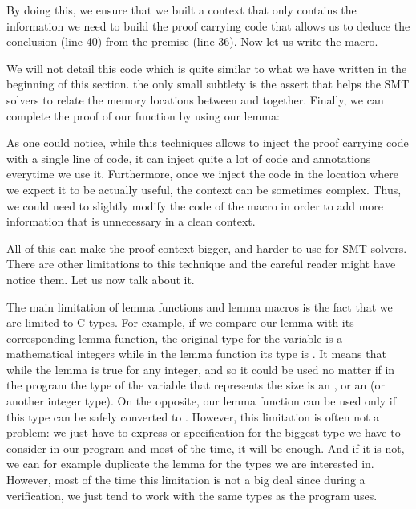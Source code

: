 By doing this, we ensure that we built a context that only contains the
information we need to build the proof carrying code that allows us to deduce
the conclusion (line 40) from the premise (line 36). Now let us write the macro.






We will not detail this code which is quite similar to what we have written in
the beginning of this section. the only small subtlety is the assert that helps
the SMT solvers to relate the memory locations between  and
 together. Finally, we can complete the proof of our function by
using our lemma:






As one could notice, while this techniques allows to inject the proof carrying
code with a single line of code, it can inject quite a lot of code and
annotations everytime we use it. Furthermore, once we inject the code in the
location where we expect it to be actually useful, the context can be sometimes
complex. Thus, we could need to slightly modify the code of the macro in order
to add more information that is unnecessary in a clean context.


All of this can make the proof context bigger, and harder to use for SMT solvers.
There are other limitations to this technique and the careful reader might have
notice them. Let us now talk about it.






The main limitation of lemma functions and lemma macros is the fact that we are
limited to C types. For example, if we compare our lemma
 with its corresponding lemma
function, the original type for the variable  is a mathematical
integers while in the lemma function its type is . It means
that while the lemma is true for any integer, and so it could be used no matter
if in the program the type of the variable that represents the size is an
, or an  (or another integer type). On the
opposite, our lemma function can be used only if this type can be safely
converted to . However, this limitation is often not a
problem: we just have to express or specification for the biggest type we have
to consider in our program and most of the time, it will be enough. And if it is
not, we can for example duplicate the lemma for the types we are interested in.
However, most of the time this limitation is not a big deal since during a
verification, we just tend to work with the same types as the program uses.



